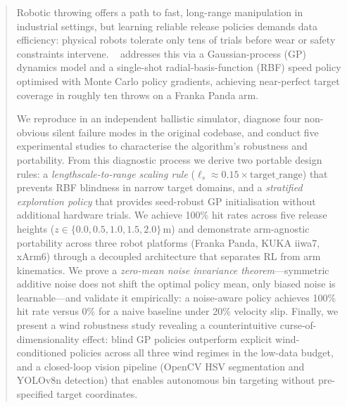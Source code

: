 \begin{abstract}
Robotic throwing offers a path to fast, long-range manipulation in industrial settings,
but learning reliable release policies demands data efficiency: physical robots tolerate
only tens of trials before wear or safety constraints intervene.
\mcpilot{}~\cite{turcato2025mcpilot} addresses this via a Gaussian-process (GP) dynamics
model and a single-shot radial-basis-function (RBF) speed policy optimised with
Monte Carlo policy gradients,
achieving near-perfect target coverage in roughly ten throws on a Franka Panda arm.

We reproduce \mcpilot{} in an independent ballistic simulator, diagnose four non-obvious
silent failure modes in the original codebase, and conduct five experimental studies to
characterise the algorithm's robustness and portability.
From this diagnostic process we derive two portable design rules: a
\emph{lengthscale-to-range scaling rule} ($\ell_s \approx 0.15 \times
\text{target\_range}$) that prevents RBF blindness in narrow target domains, and a
\emph{stratified exploration policy} that provides seed-robust GP initialisation without
additional hardware trials.
We achieve 100\% hit rates across five release heights ($z \in \{0.0, 0.5, 1.0, 1.5,
2.0\}$\,m) and demonstrate arm-agnostic portability across three robot platforms (Franka
Panda, KUKA iiwa7, xArm6) through a decoupled architecture that separates RL from arm
kinematics.
We prove a \emph{zero-mean noise invariance theorem}---symmetric additive noise does not
shift the optimal policy mean, only biased noise is learnable---and validate it
empirically: a noise-aware policy achieves 100\% hit rate versus 0\% for a naive
baseline under 20\% velocity slip.
Finally, we present a wind robustness study revealing a counterintuitive
curse-of-dimensionality effect: blind GP policies outperform explicit wind-conditioned
policies across all three wind regimes in the low-data budget, and a closed-loop vision
pipeline (OpenCV HSV segmentation and YOLOv8n detection) that enables autonomous bin
targeting without pre-specified target coordinates.
\end{abstract}
